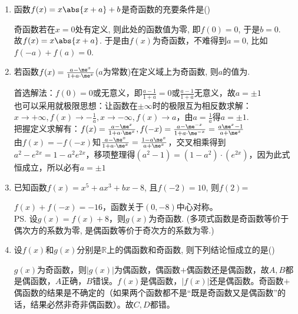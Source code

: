 \begin{enumerate}
    \item 函数$f(x)=x\abs{x+a}+b$是奇函数的充要条件是\dotfill()
    \begin{jieda}
    奇函数若在$x=0$处有定义, 则此处的函数值为零, 即$f(0)=0$, 于是$b=0$. \\
    故$f(x)=x\abs{x+a}$. 于是由$f(x)$为奇函数，不难得到$a=0$, 比如$f(-a)+f(a)=0$. 
    \end{jieda}
    \item 若函数$f(x)=\frac{a-\me^x}{1+a\cdot\me^x}$($a$为常数)在定义域上为奇函数, 则$a$的值为. 
    \begin{jieda}
    首选解法：$f(0)=0$或无意义，即$\frac{a-1}{1+a} = 0$或$\frac{a-1}{1+a}$无意义，故$a = \pm 1$\\
    也可以采用就极限思想：让函数在$\pm \infty$时的极限互为相反数求解：$x \rightarrow +\infty, f(x) \rightarrow -\frac{1}{a}, x \rightarrow -\infty, f(x) \rightarrow a$，由$a = \frac{1}{a}$得$a = \pm 1$. \\
    把握定义求解有：$f(x) = \frac{a-\me^x}{1+a\cdot\me^x}, f(-x) = \frac{a-\me^{-x}}{1+a\cdot\me^{-x}} = \frac{a\me^{x}-1}{a+\me^{x}}$ \\
    由$f(x) = -f(-x)$知$\frac{a-\me^x}{1+a\cdot\me^x} = \frac{1-a\me^{x}}{a+\me^{x}}$，交叉相乘得到$a^2 - e^{2x} = 1-a^2e^{2x}$，移项整理得$(a^2-1) = (1-a^2)\cdot(e^{2x})$，因为此式恒成立，所以必有$a = \pm 1$
    \end{jieda}
    \item 已知函数$f(x)=x^5+ax^3+bx-8$, 且$f(-2)=10$, 则$f(2)$=
    \begin{jieda}
    $f(x)+f(-x)=-16$，函数关于$(0, -8)$中心对称。\\
    \ps 设$g(x) = f(x)+8$，则$g(x)$为奇函数. (多项式函数是奇函数等价于偶次方的系数为零, 是偶函数等价于奇次方的系数为零.)
    \end{jieda}
    \item 设$f(x)$和$g(x)$分别是$\mathbb{R}$上的偶函数和奇函数, 则下列结论恒成立的是\dotfill()
    \begin{jieda}
    $g(x)$为奇函数，则$|g(x)|$为偶函数，偶函数$+$偶函数还是偶函数，故$A, B$都是偶函数，$A$正确，$B$错误。$f(x)$是偶函数，$|f(x)|$还是偶函数。奇函数$+$偶函数的结果是不确定的（如果两个函数都不是“既是奇函数又是偶函数”的话，结果必然非奇非偶函数）。故$C,D$都错。\\

\end{jieda}
\end{enumerate}
